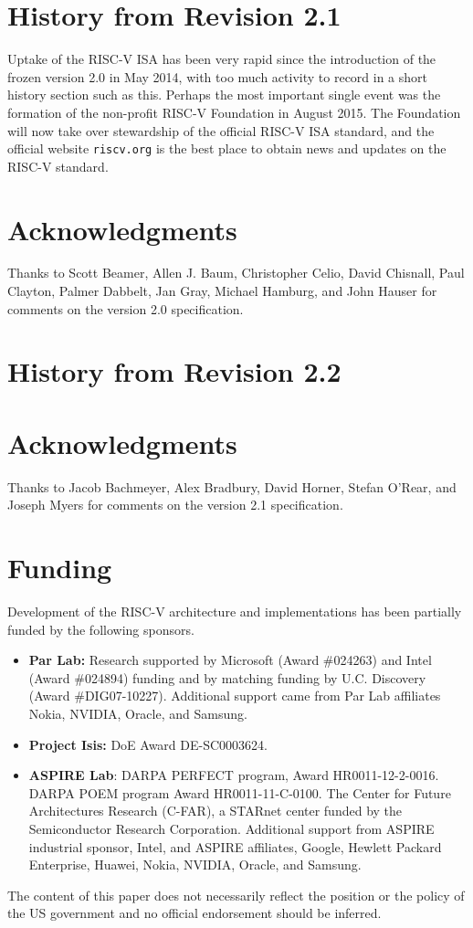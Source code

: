 \section{History from Revision 2.1}

Uptake of the RISC-V ISA has been very rapid since the introduction of
the frozen version 2.0 in May 2014, with too much activity to record
in a short history section such as this.  Perhaps the most important
single event was the formation of the non-profit RISC-V Foundation in
August 2015. The Foundation will now take over stewardship of the
official RISC-V ISA standard, and the official website {\tt riscv.org}
is the best place to obtain news and updates on the RISC-V standard.

\section*{Acknowledgments}

Thanks to Scott Beamer, Allen J. Baum, Christopher Celio, David Chisnall,
Paul Clayton, Palmer Dabbelt, Jan Gray, Michael Hamburg, and John
Hauser for comments on the version 2.0 specification.

\section{History from Revision 2.2}


\section*{Acknowledgments}

Thanks to Jacob Bachmeyer, Alex Bradbury, David Horner, Stefan O'Rear,
and Joseph Myers for comments on the version 2.1 specification.

\section{Funding}

Development of the RISC-V architecture and implementations has been
partially funded by the following sponsors.
\begin{itemize}

\item {\bf Par Lab:} Research supported by Microsoft (Award \#024263) and Intel (Award
    \#024894) funding and by matching funding by U.C. Discovery
    (Award \#DIG07-10227). Additional support came from Par Lab
    affiliates Nokia, NVIDIA, Oracle, and Samsung.

\item {\bf Project Isis:} DoE Award DE-SC0003624.

\item {\bf ASPIRE Lab}: DARPA PERFECT program, Award
    HR0011-12-2-0016.  DARPA POEM program Award HR0011-11-C-0100.  The
    Center for Future Architectures Research (C-FAR), a STARnet center
    funded by the Semiconductor Research Corporation.  Additional
    support from ASPIRE industrial sponsor, Intel, and ASPIRE
    affiliates, Google, Hewlett Packard Enterprise, Huawei, Nokia,
    NVIDIA, Oracle, and Samsung.

\end{itemize}

The content of this paper does not necessarily reflect the position or the
policy of the US government and no official endorsement should be
inferred.
